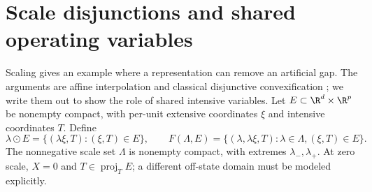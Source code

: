 \section{Scale disjunctions and shared operating variables}\label{app:scaling}
Scaling gives an example where a representation can remove an
artificial gap. The arguments are affine interpolation and
classical disjunctive convexification
\citep[Section 2, Theorem 2.1]{Balas1998}; we write them out to show the
role of shared intensive variables.
Let $E\subset\R^d\times\R^p$ be nonempty compact, with per-unit extensive
coordinates $\xi$ and intensive coordinates $T$. Define
\[
 \lambda\odot E=\{(\lambda\xi,T):(\xi,T)\in E\},\qquad
 F(\Lambda,E)=\{(\lambda,\lambda\xi,T):\lambda\in\Lambda,(\xi,T)\in E\}.
\]
The nonnegative scale set $\Lambda$ is nonempty compact, with extremes
$\lambda_-,\lambda_+$. At zero scale, $X=0$ and $T\in\operatorname{proj}_T E$;
a different off-state domain must be modeled explicitly.

